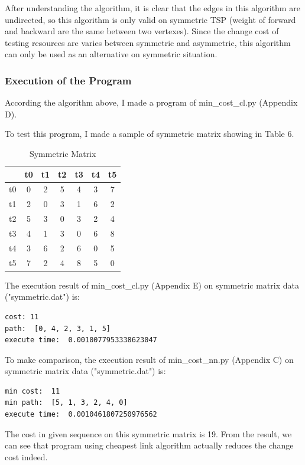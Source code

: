 \documentclass[12pt,a4paper]{article}
\begin{document}
After understanding the algorithm, it is clear that the edges in this algorithm are undirected, so this algorithm is only valid on symmetric TSP (weight of forward and backward are the same between two vertexes). Since the change cost of testing resources are varies between symmetric and asymmetric, this algorithm can only be used as an alternative on symmetric situation.

\subsubsection{Execution of the Program}

According the algorithm above, I made a program of min\_cost\_cl.py (Appendix D).

To test this program, I made a sample of symmetric matrix showing in Table 6.

\begin{table}[htbp]
\centering
\caption{Symmetric Matrix}
\begin{tabular}{|c|cccccc|}\hline
	 & t0 & t1 & t2 & t3 & t4 & t5 \\\hline
	t0 & 0 & 2 & 5 & 4 & 3 & 7\\
	t1 & 2 & 0 & 3 & 1 & 6 & 2\\
	t2 & 5 & 3 & 0 & 3 & 2 & 4\\
	t3 & 4 & 1 & 3 & 0 & 6 & 8\\
	t4 & 3 & 6 & 2 & 6 & 0 & 5\\
	t5 & 7 & 2 & 4 & 8 & 5 & 0\\\hline
\end{tabular}
\end{table}

The execution result of min\_cost\_cl.py (Appendix E) on symmetric matrix data ("symmetric.dat") is: 

\begin{lstlisting}
cost: 11
path:  [0, 4, 2, 3, 1, 5]
execute time:  0.0010077953338623047
\end{lstlisting}

To make comparison, the execution result of min\_cost\_nn.py (Appendix C) on symmetric matrix data ("symmetric.dat") is: 

\begin{lstlisting}
min cost:  11
min path:  [5, 1, 3, 2, 4, 0]
execute time:  0.0010461807250976562
\end{lstlisting}

The cost in given sequence on this symmetric matrix is 19. From the result, we can see that program using cheapest link algorithm actually reduces the change cost indeed. 
\end{document}
